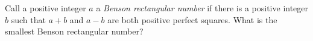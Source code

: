Call a positive integer $a$ a \emph{Benson rectangular number} if there is a positive integer $b$ such that $a+b$ and $a-b$ are both positive perfect squares. What is the smallest Benson rectangular number?
